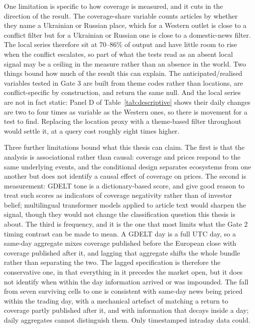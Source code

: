 \documentclass[12pt,a4paper]{article}
\begin{document}
One limitation is specific to how coverage is measured, and it cuts in the direction of the result. The coverage-share variable counts articles by whether they name a Ukrainian or Russian place, which for a Western outlet is close to a conflict filter but for a Ukrainian or Russian one is close to a domestic-news filter. The local series therefore sit at 70--86\% of output and have little room to rise when the conflict escalates, so part of what the tests read as an absent local signal may be a ceiling in the measure rather than an absence in the world. Two things bound how much of the result this can explain. The anticipated/realised variables tested in Gate 3 are built from theme codes rather than locations, are conflict-specific by construction, and return the same null. And the local series are not in fact static: Panel D of Table~\ref{tab:descriptive} shows their daily changes are two to four times as variable as the Western ones, so there is movement for a test to find. Replacing the location proxy with a theme-based filter throughout would settle it, at a query cost roughly eight times higher.

Three further limitations bound what this thesis can claim. The first is that the analysis is associational rather than causal: coverage and prices respond to the same underlying events, and the conditional design separates ecosystems from one another but does not identify a causal effect of coverage on prices. The second is measurement: GDELT tone is a dictionary-based score, and \citet{loughran2011textual} give good reason to treat such scores as indicators of coverage negativity rather than of investor belief; multilingual transformer models applied to article text would sharpen the signal, though they would not change the classification question this thesis is about. The third is frequency, and it is the one that most limits what the Gate 2 timing contrast can be made to mean. A GDELT day is a full UTC day, so a same-day aggregate mixes coverage published before the European close with coverage published after it, and lagging that aggregate shifts the whole bundle rather than separating the two. The lagged specification is therefore the conservative one, in that everything in it precedes the market open, but it does not identify when within the day information arrived or was impounded. The fall from seven surviving cells to one is consistent with same-day news being priced within the trading day, with a mechanical artefact of matching a return to coverage partly published after it, and with information that decays inside a day; daily aggregates cannot distinguish them. Only timestamped intraday data could.
\end{document}
